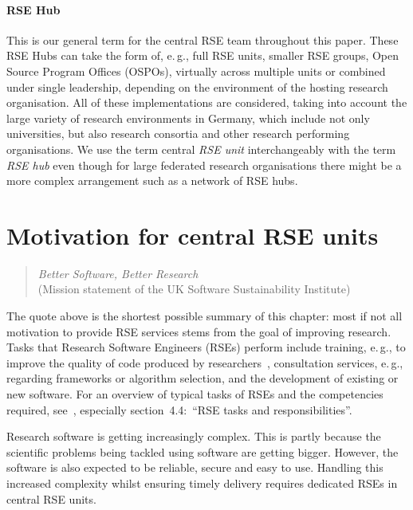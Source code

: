 \documentclass[a4paper]{article}
\newcommand*{\eg}{e.\,g.,\xspace}
\begin{document}
\paragraph{RSE Hub}
This is our general term for the central RSE team throughout this paper.
These RSE Hubs can take the form of, \eg{} full RSE units, smaller RSE groups, Open Source Program Offices (OSPOs), virtually across multiple units or combined under single leadership, depending on the environment of the hosting research organisation.
All of these implementations are considered, taking into account the large variety of research environments in Germany, which include not only universities, but also research consortia and other research performing organisations.
We use the term central \emph{RSE unit} interchangeably with the term \emph{RSE hub} even though for large federated research organisations there might be a more complex arrangement such as a network of RSE hubs.

\section{Motivation for central RSE units}
\begin{quotation}
      \noindent \textit{Better Software, Better Research}\\(Mission statement of the UK Software Sustainability Institute)
\end{quotation}

The quote above is the shortest possible summary of this chapter: most if not all motivation to provide RSE services stems from the goal of improving research.
Tasks that Research Software Engineers (RSEs) perform include training, \eg{} to improve the quality of code produced by researchers~\autocite{Ostlund2023}, consultation services, \eg{} regarding frameworks or algorithm selection, and the development of existing or new software.
For an overview of typical tasks of RSEs and the competencies required, see~\autocite{goth_foundational_competencies_2024}, especially section\ 4.4:\ “RSE tasks and responsibilities”.

Research software is getting increasingly complex.
This is partly because the scientific problems being tackled using software are getting bigger.
However, the software is also expected to be reliable, secure and easy to use.
Handling this increased complexity whilst ensuring timely delivery requires dedicated RSEs in central RSE units.
\end{document}
